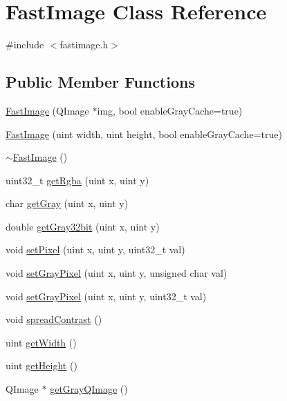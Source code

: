 \hypertarget{class_fast_image}{
\section{FastImage Class Reference}
\label{class_fast_image}
}


{\ttfamily \#include $<$fastimage.h$>$}

\subsection*{Public Member Functions}
\begin{DoxyCompactItemize}
\item 
\hyperlink{class_fast_image_a1ee91a3ac8ddcdfed90e9906bb3f0681}{FastImage} (QImage $\ast$img, bool enableGrayCache=true)
\item 
\hyperlink{class_fast_image_ab9530428f52635d4f87d9b1cc33e10cd}{FastImage} (uint width, uint height, bool enableGrayCache=true)
\item 
\hyperlink{class_fast_image_ae2937f18d549ffc788abaa1a5bf6f492}{$\sim$FastImage} ()
\item 
uint32\_\-t \hyperlink{class_fast_image_a09e6df8ae76ddffb813048157f887ee6}{getRgba} (uint x, uint y)
\item 
char \hyperlink{class_fast_image_a7da37f6c5c99feea80c6a699c7b51bd8}{getGray} (uint x, uint y)
\item 
double \hyperlink{class_fast_image_a6975ad540e89b98fda1b7a3bd3f812ea}{getGray32bit} (uint x, uint y)
\item 
void \hyperlink{class_fast_image_a647ac3b76f0198da77cd2e7afa46e1c4}{setPixel} (uint x, uint y, uint32\_\-t val)
\item 
void \hyperlink{class_fast_image_a1e0ef4ac5b61cc6d96c9cd9c4bada344}{setGrayPixel} (uint x, uint y, unsigned char val)
\item 
void \hyperlink{class_fast_image_a018ae53445320129fa129b80e805842c}{setGrayPixel} (uint x, uint y, uint32\_\-t val)
\item 
void \hyperlink{class_fast_image_adcf6d77e79c1f75f2420c6db0d96951d}{spreadContrast} ()
\item 
uint \hyperlink{class_fast_image_a94290d65ff847f0a7e56ac8050133313}{getWidth} ()
\item 
uint \hyperlink{class_fast_image_a1b90d63510575306ce345e393574d85c}{getHeight} ()
\item 
QImage $\ast$ \hyperlink{class_fast_image_afda157efb702f601288d5e6c2e37a299}{getGrayQImage} ()
\end{DoxyCompactItemize}
